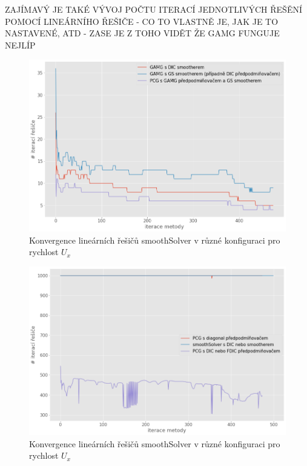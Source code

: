 \documentclass[a4paper,12pt]{report}
\theoremstyle{remark}
\begin{document}
ZAJÍMAVÝ JE TAKÉ VÝVOJ POČTU ITERACÍ JEDNOTLIVÝCH ŘEŠĚNÍ POMOCÍ LINEÁRNÍHO ŘEŠIČE - CO TO VLASTNĚ JE, JAK JE TO NASTAVENÉ, ATD - ZASE JE Z TOHO VIDĚT ŽE GAMG FUNGUJE NEJLÍP

\begin{figure}[H]
	\centering
	\includegraphics[width=1\linewidth]{p-solver-iters-1.png}
	\caption{Konvergence lineárních řešičů smoothSolver v různé konfiguraci pro rychlost $U_x$}
	\label{fig:p-iters-1}
\end{figure}

\begin{figure}[H]
	\centering
	\includegraphics[width=1\linewidth]{p-solver-iters-2.png}
	\caption{Konvergence lineárních řešičů smoothSolver v různé konfiguraci pro rychlost $U_x$}
	\label{fig:p-iters-2}
\end{figure}
\end{document}
